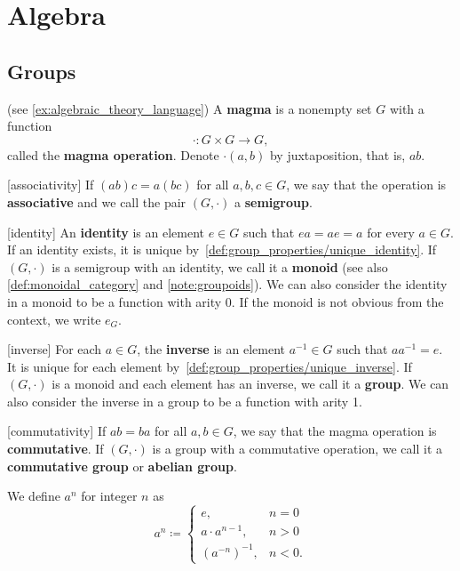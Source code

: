 \section{Algebra}\label{sec:algebra}
\subsection{Groups}\label{subsec:groups}

\begin{definition}\label{def:magma}(see \cref{ex:algebraic_theory_language})
  A \textbf{magma} is a nonempty set \( G \) with a function 
  \begin{equation*}
    \cdot: G \times G \to G,
  \end{equation*}
  called the \textbf{magma operation}. Denote \( \cdot(a, b) \) by juxtaposition, that is, \( ab \).

  \begin{description}
    [associativity] If \( (ab)c = a(bc) \) for all \( a, b, c \in G \), we say that the operation is \textbf{associative} and we call the pair \( (G, \cdot) \) a \textbf{semigroup}.

    [identity] An \textbf{identity} is an element \( e \in G \) such that \( ea = ae = a \) for every \( a \in G \). If an identity exists, it is unique by~\cref{def:group_properties/unique_identity}. If \( (G, \cdot) \) is a semigroup with an identity, we call it a \textbf{monoid} (see also \cref{def:monoidal_category} and \cref{note:groupoids}). We can also consider the identity in a monoid to be a function with arity 0. If the monoid is not obvious from the context, we write \( e_G \).

    [inverse] For each \( a \in G \), the \textbf{inverse} is an element \( a^{-1} \in G \) such that \( aa^{-1} = e \). It is unique for each element by~\cref{def:group_properties/unique_inverse}. If \( (G, \cdot) \) is a monoid and each element has an inverse, we call it a \textbf{group}. We can also consider the inverse in a group to be a function with arity 1.

    [commutativity] If \( ab = ba \) for all \( a, b \in G \), we say that the magma operation is \textbf{commutative}. If \( (G, \cdot) \) is a group with a commutative operation, we call it a \textbf{commutative group} or \textbf{abelian group}.
  \end{description}

  We define \( a^n \) for integer \( n \) as
  \begin{equation*}
    a^n \coloneqq \begin{cases}
      e, &n = 0 \\
      a \cdot a^{n-1}, &n > 0 \\
      (a^{-n})^{-1}, &n < 0.
    \end{cases}
  \end{equation*}


\end{definition}
